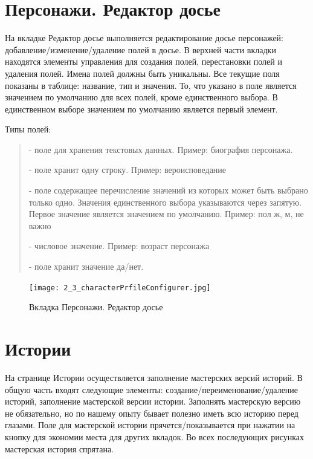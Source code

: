 \documentclass[a4paper,oneside,10pt,russian]{sphinxmanual}
\begin{document}
\section{Персонажи. Редактор досье}
\label{pages:id6}\label{pages:characters-profile-editor}
На вкладке Редактор досье выполняется редактирование досье персонажей: добавление/изменение/удаление полей в досье. В верхней части вкладки находятся элементы управления для создания полей, перестановки полей и удаления полей. Имена полей должны быть уникальны. Все текущие поля показаны в таблице: название, тип и значения. То, что указано в поле  является значением по умолчанию для всех полей, кроме единственного выбора. В единственном выборе значением по умолчанию является первый элемент.

Типы полей:
\begin{quote}

 - поле для хранения текстовых данных. Пример: биография персонажа.

 - поле хранит одну строку. Пример: вероисповедание

 - поле содержащее перечисление значений из которых может быть выбрано только одно. Значения единственного выбора указываются через запятую. Первое значение является значением по умолчанию. Пример: пол ж, м, не важно

 - числовое значение. Пример: возраст персонажа

 - поле хранит значение да/нет.
\end{quote}
\begin{figure}[H]
\centering
\capstart

\texttt{[image: 2\_3\_characterPrfileConfigurer.jpg]}
\caption{Вкладка Персонажи. Редактор досье}\end{figure}
\newpage

\section{Истории}
\label{pages:story-desc}\label{pages:id7}
На странице Истории осуществляется заполнение мастерских версий историй. В общую часть входят следующие элементы: создание/переименование/удаление историй, заполнение мастерской версии истории. Заполнять мастерскую версию не обязательно, но по нашему опыту бывает полезно иметь всю историю перед глазами. Поле для мастерской истории прячется/показывается при нажатии на кнопку  для экономии места для других вкладок. Во всех последующих рисунках мастерская история спрятана.
\end{document}
